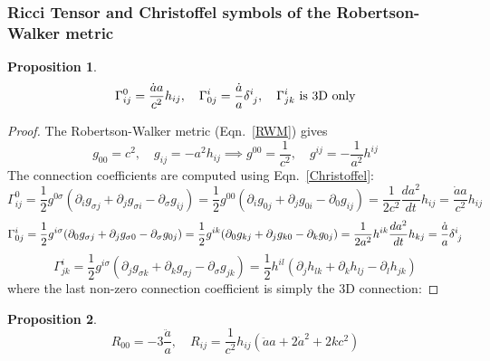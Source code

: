 \documentclass[a4paper]{article}
\theoremstyle{new}
\newtheorem{prop}{Proposition}[section]
\begin{document}
\subsubsection{Ricci Tensor and Christoffel symbols of the Robertson-Walker metric}
\begin{prop}
\begin{equation}
    \Gamma^0_{ij}=\frac{\dot{a}a}{c^2}h_{ij},\quad\Gamma_{0j}^i=\frac{\dot{a}}{a}\tensor*{\delta}{*_{}^{i}_{j}},\quad\Gamma^i_{jk}\text{ is 3D only}\label{connectionRWM}
\end{equation}
\end{prop}
\begin{proof}
The Robertson-Walker metric (Eqn.~\ref{RWM}) gives
$$g_{00}=c^2,\quad g_{ij}=-a^2h_{ij}\implies g^{00}=\frac{1}{c^2},\quad g^{ij}=-\frac{1}{a^2}h^{ij}$$
The connection coefficients are computed using Eqn.~\ref{Christoffel}:
$$\Gamma^0_{ij}=\frac{1}{2}g^{0\sigma}(\partial_ig_{\sigma j}+\partial_jg_{\sigma i}-\partial_\sigma g_{ij})=\frac{1}{2}g^{00}(\partial_ig_{0j}+\partial_jg_{0i}-\partial_0g_{ij})=\frac{1}{2c^2}\frac{da^2}{dt}h_{ij}=\frac{\dot{a}a}{c^2}h_{ij}$$
$$\Gamma^i_{0j}=\frac{1}{2}g^{i\sigma}(\partial_0g_{\sigma j}+\partial_jg_{\sigma 0}-\partial_\sigma g_{0j})=\frac{1}{2}g^{ik}(\partial_0g_{kj}+\partial_jg_{k0}-\partial_kg_{0j})=\frac{1}{2a^2}h^{ik}\frac{da^2}{dt}h_{kj}=\frac{\dot{a}}{a}\tensor*{\delta}{*_{}^{i}_{j}}$$
$$\Gamma^i_{jk}=\frac{1}{2}g^{i\sigma}(\partial_jg_{\sigma k}+\partial_kg_{\sigma j}-\partial_\sigma g_{jk})=\frac{1}{2}h^{il}(\partial_jh_{lk}+\partial_kh_{lj}-\partial_lh_{jk})$$
where the last non-zero connection coefficient is simply the 3D connection:
\end{proof}
\begin{prop}
\begin{equation}
R_{00}=-3\frac{\ddot{a}}{a},\quad R_{ij}=\frac{1}{c^2}h_{ij}(\ddot{a}a+2\dot{a}^2+2kc^2)\label{RicciRWM}
\end{equation}
\end{prop}
\end{document}
